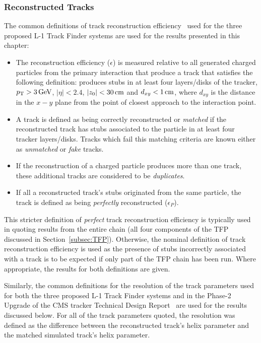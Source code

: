 \subsubsection{Reconstructed Tracks}\label{subsec:recoTracks}
The common definitions of track reconstruction efficiency~\cite{TMTT_JINST} used for the three proposed L-1 Track Finder systems are used for the results presented in this chapter:

\begin{itemize}
\item The reconstruction efficiency ($\epsilon$) is measured relative to all generated charged particles from the primary interaction that produce a track that satisfies the following definition: produces stubs in at least four layers/disks of the tracker, $p_{\mathrm{T}} > 3\,\text{Ge\hspace{-.08em}V}$, $|\eta| < 2.4$, $|z_{0}| < 30\,\text{cm}$ and $d_{xy} < 1\,\text{cm}$, where $d_{xy}$ is the distance in the $x-y$ plane from the point of closest approach to the interaction point.
\item A track is defined as being correctly reconstructed or \emph{matched} if the reconstructed track has stubs associated to the particle in at least four tracker layers/disks. Tracks which fail this matching criteria are known either as \emph{unmatched} or \emph{fake} tracks.
\item If the reconstruction of a charged particle produces more than one track, these additional tracks are considered to be \emph{duplicates}.
\item If all a reconstructed track's stubs originated from the same particle, the track is defined as being \emph{perfectly} reconstructed ($\epsilon_{P}$). 
\end{itemize}

This stricter definition of \emph{perfect} track reconstruction efficiency is typically used in quoting results from the entire chain (\ie all four components of the TFP discussed in Section~\ref{subsec:TFP}).
Otherwise, the nominal definition of track reconstruction efficiency is used as the presence of stubs incorrectly associated with a track is to be expected if only part of the TFP chain has been run.
Where appropriate, the results for both definitions are given.

Similarly, the common definitions for the resolution of the track parameters used for both the three proposed L-1 Track Finder systems and in the Phase-2 Upgrade of the CMS tracker Technical Design Report~\cite{P2TrackerTDR} are used for the results discussed below.
For all of the track parameters quoted, the resolution was defined as the difference between the reconstructed track's helix parameter and the matched simulated track's helix parameter.


